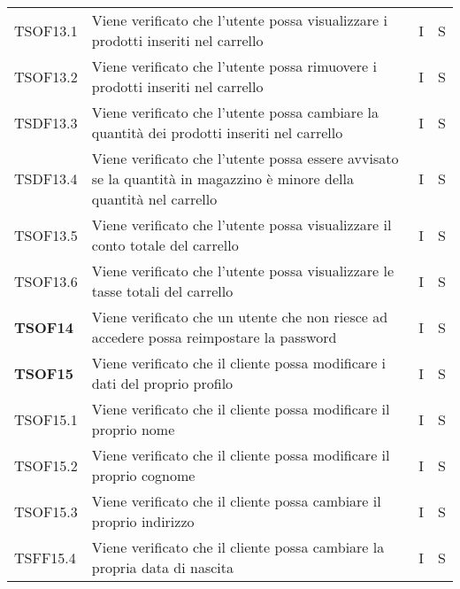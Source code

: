 \begin{center}
\begin{longtable}[!h]{p{60px} p{240px} p{35px} p{35px}}
        TSOF13.1        & Viene verificato che l'utente possa visualizzare i prodotti inseriti nel carrello                                    & I              & S              \\
        TSOF13.2        & Viene verificato che l'utente possa rimuovere i prodotti inseriti nel carrello                                       & I              & S              \\
        TSDF13.3        & Viene verificato che l'utente possa cambiare la quantità dei prodotti inseriti nel carrello                          & I              & S              \\
        TSDF13.4        & Viene verificato che l'utente possa essere avvisato se la quantità in magazzino è minore della quantità nel carrello & I              & S              \\
        TSOF13.5        & Viene verificato che l'utente possa visualizzare il conto totale del carrello                                        & I              & S              \\
        TSOF13.6        & Viene verificato che l'utente possa visualizzare le tasse totali del carrello                                        & I              & S              \\
        \textbf{TSOF14} & Viene verificato che un utente che non riesce ad accedere possa reimpostare la password                              & I              & S              \\
        \textbf{TSOF15} & Viene verificato che il cliente possa modificare i dati del proprio profilo                                          & I              & S              \\
        TSOF15.1        & Viene verificato che il cliente possa modificare il proprio nome                                                     & I              & S              \\
        TSOF15.2        & Viene verificato che il cliente possa modificare il proprio cognome                                                  & I              & S              \\
        TSOF15.3        & Viene verificato che il cliente possa cambiare il proprio indirizzo                                                  & I              & S              \\
        TSFF15.4        & Viene verificato che il cliente possa cambiare la propria data di nascita                                            & I              & S              \\

\end{longtable}
\end{center}
